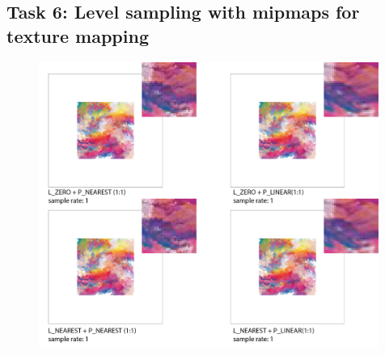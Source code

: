 \documentclass[11pt]{article}
\begin{document}
\subsection*{Task 6: Level sampling with mipmaps for texture mapping}
\begin{figure}[h]
    \centering
    \includegraphics[width=0.99\textwidth]{T6f1-01.png} %
  \end{figure}
\end{document}
